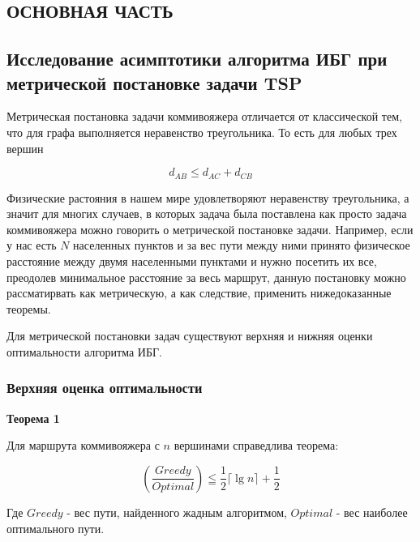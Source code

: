 \documentclass[a4paper, 14pt]{extarticle}
\numberwithin{equation}{section}
\begin{document}
\newpage

\begin{center}
\chapter{\textbf{ОСНОВНАЯ ЧАСТЬ}}
\end{center}

\setcounter{section}{0}


\section{Исследование асимптотики алгоритма ИБГ при метрической постановке задачи TSP}

Метрическая постановка задачи коммивояжера отличается от классической тем, что для графа выполняется неравенство треугольника. То есть для любых трех вершин

\begin{equation}
d_{AB} \leq d_{AC} + d_{CB}
\end{equation}

Физические растояния в нашем мире удовлетворяют неравенству треугольника, а значит для многих случаев, в которых задача была поставлена как просто задача коммивояжера можно говорить о метрической постановке задачи. Например, если у нас есть $N$ населенных пунктов и за вес пути между ними принято физическое расстояние между двумя  населенными пунктами и нужно посетить их все, преодолев минимальное расстояние за весь маршрут, данную постановку можно рассматирвать как метрическую, а как следствие, применить нижедоказанные теоремы.

Для метрической постановки задач существуют верхняя и нижняя оценки оптимальности алгоритма ИБГ. \\


\subsection{Верхняя оценка оптимальности}

\textbf{Теорема 1}

Для маршрута коммивояжера с $n$ вершинами справедлива теорема:

\begin{equation}
	(\frac{Greedy}{Optimal}) \leqq \frac{1}{2}\lceil{\lg n}\rceil + \frac{1}{2}
\end{equation}

Где $Greedy$ - вес пути, найденного жадным алгоритмом, $Optimal$ - вес наиболее оптимального пути.
\end{document}
